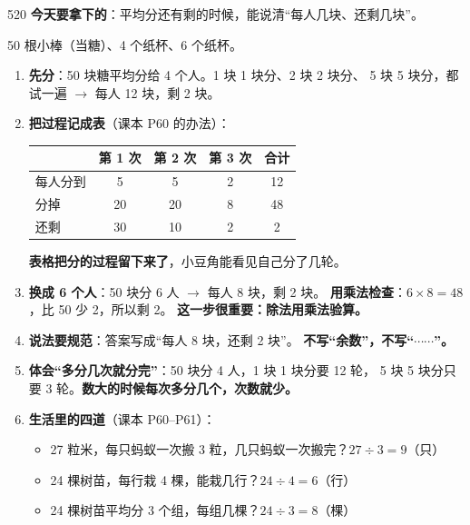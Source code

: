 \begin{lesson}{5}{20}
\textbf{今天要拿下的}：平均分还有剩的时候，能说清“每人几块、还剩几块”。

\begin{materials}
50 根小棒（当糖）、4 个纸杯、6 个纸杯。
\end{materials}

\begin{enumerate}
  \item \textbf{先分}：50 块糖平均分给 4 个人。1 块 1 块分、2 块 2 块分、
        5 块 5 块分，都试一遍 $\to$ 每人 12 块，剩 2 块。
  \item \textbf{把过程记成表}（课本 P60 的办法）：
        \begin{center}
        \small
        \begin{tabular}{@{}lcccc@{}}
        \toprule
        & 第 1 次 & 第 2 次 & 第 3 次 & 合计 \\
        \midrule
        每人分到 & 5 & 5 & 2 & 12 \\
        分掉 & 20 & 20 & 8 & 48 \\
        还剩 & 30 & 10 & 2 & 2 \\
        \bottomrule
        \end{tabular}
        \end{center}
        \textbf{表格把分的过程留下来了}，小豆角能看见自己分了几轮。
  \item \textbf{换成 6 个人}：50 块分 6 人 $\to$ 每人 8 块，剩 2 块。
        \textbf{用乘法检查}：$6\times8=48$，比 50 少 2，所以剩 2。
        \textbf{这一步很重要：除法用乘法验算。}
  \item \textbf{说法要规范}：答案写成“每人 8 块，还剩 2 块”。
        \textbf{不写“余数”，不写“$\cdots\cdots$”。}
  \item \textbf{体会“多分几次就分完”}：50 块分 4 人，1 块 1 块分要 12 轮，
        5 块 5 块分只要 3 轮。\textbf{数大的时候每次多分几个，次数就少。}
  \item \textbf{生活里的四道}（课本 P60--P61）：
        \begin{itemize}
          \item 27 粒米，每只蚂蚁一次搬 3 粒，几只蚂蚁一次搬完？$27\div3=9$（只）
          \item 24 棵树苗，每行栽 4 棵，能栽几行？$24\div4=6$（行）
          \item 24 棵树苗平均分 3 个组，每组几棵？$24\div3=8$（棵）
        \end{itemize}
\end{enumerate}


\end{lesson}
